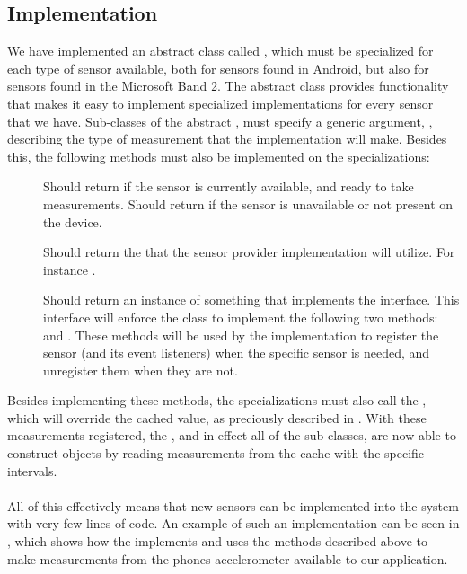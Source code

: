 \subsection{Implementation}
We have implemented an abstract class called , which must be specialized for each type of sensor available, both for sensors found in Android, but also for sensors found in the Microsoft Band 2. The abstract class provides functionality that makes it easy to implement specialized implementations for every sensor that we have. Sub-classes of the abstract , must specify a generic argument, , describing the type of measurement that the implementation will make. Besides this, the following methods must also be implemented on the specializations:


\begin{description}
	\item[] Should return  if the sensor is currently available, and ready to take measurements. Should return  if the sensor is unavailable or not present on the device.

	\item[] Should return the  that the sensor provider implementation will utilize. For instance .

	\item[] Should return an instance of something that implements the  interface. This interface will enforce the class to implement the following two methods:  and . These methods will be used by the  implementation to register the sensor (and its event listeners) when the specific sensor is needed, and unregister them when they are not.
\end{description}

Besides implementing these methods, the specializations must also call the , which will override the cached value, as preciously described in . With these measurements registered, the , and in effect all of the sub-classes, are now able to construct  objects by reading measurements from the cache with the specific intervals. 
\\\\
All of this effectively means that new sensors can be implemented into the system with very few lines of code. An example of such an implementation can be seen in , which shows how the  implements and uses the methods described above to make measurements from the phones accelerometer available to our application. 

